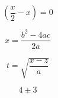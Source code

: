 \documentclass[11pt]{article}
\begin{document}
$$\left( \frac{x}{2} - x \right)=0 $$

$$x = \frac{b^2-4ac}{2a}$$

$$t = \sqrt{\frac{x-z}{a}}$$

$$4\pm3$$
\end{document}
